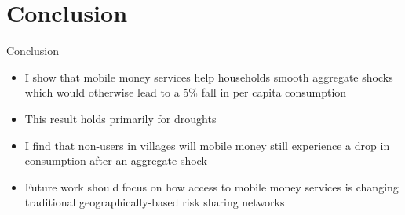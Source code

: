 \documentclass[t]{beamer}
\begin{document}
\section{Conclusion}
\begin{frame}{Conclusion}
\begin{itemize}
\item I show that mobile money services help households smooth aggregate shocks which would otherwise lead to a 5\% fall in per capita consumption
\item This result holds primarily for droughts
\item I find that non-users in villages will mobile money still experience a drop in consumption after an aggregate shock
\item Future work should focus on how access to mobile money services is changing traditional geographically-based risk sharing networks
\end{itemize}
\end{frame}
\appendix

\begin{frame}[label=supplemental]

\hyperlink{data}{}
\end{frame}
\begin{frame}[label=idio]

\hyperlink{main results}{}
\end{frame}
\end{document}
